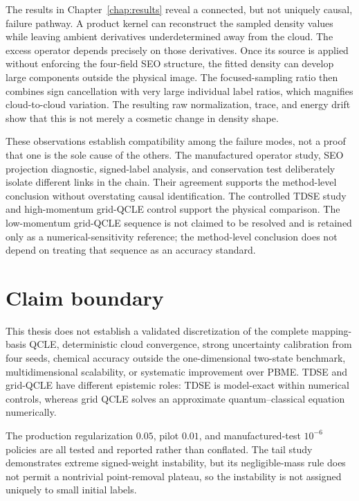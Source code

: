 \documentclass[
  11pt,
  letterpaper,
  onehalfspacing,
  normalmargins,
  equalmargins,
  oneside
]{ut-thesis}
\begin{document}
The results in Chapter~\ref{chap:results} reveal a connected, but not uniquely
causal, failure pathway. A product kernel can reconstruct the sampled density
values while leaving ambient derivatives underdetermined away from the cloud.
The excess operator depends precisely on those derivatives. Once its source
is applied without enforcing the four-field SEO structure, the fitted density
can develop large components outside the physical image. The focused-sampling
ratio then combines sign cancellation with very large individual label ratios,
which magnifies cloud-to-cloud variation. The resulting raw normalization,
trace, and energy drift show that this is not merely a cosmetic change in
density shape.

These observations establish compatibility among the failure modes, not a
proof that one is the sole cause of the others. The manufactured operator
study, SEO projection diagnostic, signed-label analysis, and conservation
test deliberately isolate different links in the chain. Their agreement
supports the method-level conclusion without overstating causal identification.
The controlled TDSE study and high-momentum grid-QCLE control support the
physical comparison. The low-momentum grid-QCLE sequence is not claimed to be
resolved and is retained only as a numerical-sensitivity reference; the
method-level conclusion does not depend on treating that sequence as an
accuracy standard.

\section{Claim boundary}
\label{sec:discussion-limitations}

This thesis does not establish a validated discretization of the complete
mapping-basis QCLE, deterministic cloud convergence, strong uncertainty
calibration from four seeds, chemical accuracy outside the one-dimensional
two-state benchmark, multidimensional scalability, or systematic improvement
over PBME. TDSE and grid-QCLE have different epistemic roles: TDSE is
model-exact within numerical controls, whereas grid QCLE solves an approximate
quantum--classical equation numerically.

The production regularization \(0.05\), pilot \(0.01\), and
manufactured-test \(10^{-6}\) policies are all tested and reported rather than
conflated. The tail study demonstrates extreme signed-weight instability, but
its negligible-mass rule does not permit a nontrivial point-removal plateau,
so the instability is not assigned uniquely to small initial labels.
\end{document}
